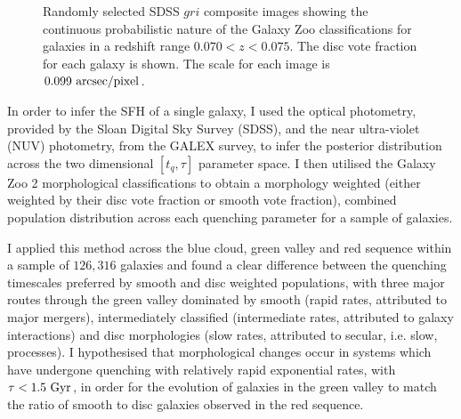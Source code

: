 \documentclass[12pt, usenatbib]{article}
\begin{document}
\begin{figure}[t]
\caption{Randomly selected SDSS $gri$ composite images showing the continuous probabilistic nature of the Galaxy Zoo classifications for galaxies in a redshift range $0.070 < z < 0.075$. The disc vote fraction for each galaxy is shown. The scale for each image is $0.099~\rm{arcsec/pixel}$.}
\label{fig:mosaic}
\end{figure}

In order to infer the SFH of a single galaxy, I used the optical photometry, provided by the Sloan Digital Sky Survey (SDSS), and the near ultra-violet (NUV) photometry, from the GALEX survey, to infer the posterior distribution across the two dimensional $[t_q, \tau]$ parameter space. I then utilised the Galaxy Zoo 2 morphological classifications to obtain a morphology weighted (either weighted by their disc vote fraction or smooth vote fraction), combined population distribution across each quenching parameter for a sample of galaxies. 

I applied this method across the blue cloud, green valley and red sequence within a sample of $126,316$ galaxies and found a clear difference between the quenching timescales preferred by smooth and disc weighted populations, with three major routes through the green valley dominated by smooth (rapid rates, attributed to major mergers), intermediately classified (intermediate rates, attributed to galaxy interactions) and disc morphologies (slow rates, attributed to secular, i.e. slow, processes). I hypothesised that morphological changes occur in systems which have undergone quenching with relatively rapid exponential rates, with $\tau < 1.5~\rm{Gyr}$, in order for the evolution of galaxies in the green valley to match the ratio of smooth to disc galaxies observed in the red sequence.
\end{document}
